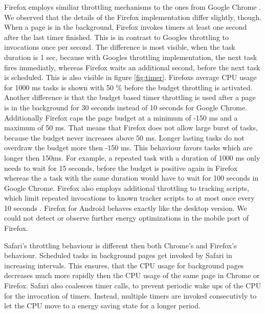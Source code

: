 \documentclass[
	ruledheaders=section,%
	class=report,%
	thesis={type=bachelor},%
	accentcolor=9c,%
	custommargins=true,%
	marginpar=false,%
	parskip=half-,%
	fontsize=11pt,%
]{tudapub}
\begin{document}
  Firefox employs similiar throttling mechanisms to the ones from Google Chrome \cite{mdn-page-visibility}. We observed that the details of the Firefox implementation differ slightly, though. When a page is in the background, Firefox invokes timers at least one second after the last timer finished. This is in contrast to Googles throttling to invocations once per second. The difference is most visible, when the task duration is 1 sec, because with Googles throttling implementation, the next task fires immediatly, whereas Firefox waits an additional second, before the next task is scheduled. This is also visible in figure \ref{fig:timer}. Firefoxs average CPU usage for 1000 ms tasks is shown with 50 \% before the budget throttling is activated. Another difference is that the budget based timer throttling is used after a page is in the background for 30 seconds instead of 10 seconds for Google Chrome. Additionally Firefox caps the page budget at a minimum of -150 ms and a maximum of 50 ms. That means that Firefox does not allow large burst of tasks, because the budget never increases above 50 ms. Longer lasting tasks do not overdraw the budget more then -150 ms. This behaviour favors tasks which are longer then 150ms. For example, a repeated task with a duration of 1000 ms only needs to wait for 15 seconds, before the budget is positive again in Firefox whereas the a task with the same duration would have to wait for 100 seconds in Google Chrome. Firefox also employs additional throttling to tracking scripts, which limit repeated invocations to known tracker scripts to at most once every 10 seconds \cite{mdn-tracker-throttling}. Firefox for Android behaves exactly like the desktop version. We could not detect or observe further energy optimizations in the mobile port of Firefox. 

  Safari's throttling behaviour is different then both Chrome's and Firefox's behaviour. Scheduled tasks in background pages get invoked by Safari in increasing intervals. This ensures, that the CPU usage for background pages decreases much more rapidly then the CPU usage of the same page in Chrome or Firefox. Safari also coalesces timer calls, to prevent periodic wake ups of the CPU for the invocation of timers. Instead, multiple timers are invoked consecutivly to let the CPU move to a energy saving state for a longer period.

  
  
\end{document}
